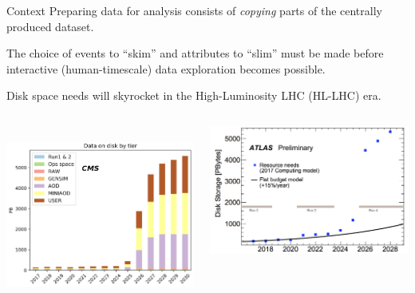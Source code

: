 \documentclass[aspectratio=169]{beamer}
\begin{document}
\begin{frame}{Context}
\vspace{0.25 cm}
Preparing data for analysis consists of {\it copying} parts of the centrally produced dataset.

\vspace{0.25 cm}
The choice of events to ``skim'' and attributes to ``slim'' must be made before interactive (human-timescale) data exploration becomes possible.

\vspace{0.25 cm}
Disk space needs will skyrocket in the High-Luminosity LHC (HL-LHC) era.

\vspace{0.5 cm}
\begin{columns}[c]
\mbox{ } \hfill \includegraphics[height=4.5 cm]{cms-data-explosion.png}


\vspace{0.2 cm}
\includegraphics[height=4.4 cm]{atlas-data-explosion.png} \hfill \mbox{ }
\end{columns}
\end{frame}
\end{document}
